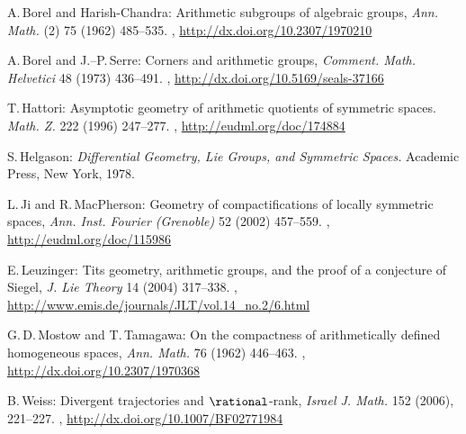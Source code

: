 \begin{references}{9}

 A.\,Borel and Harish-Chandra:
 Arithmetic subgroups of algebraic groups,
 \emph{Ann. Math.} (2) 75 (1962) 485--535.
 ,
 \maynewline
 \url{http://dx.doi.org/10.2307/1970210}

 A.\,Borel and J.--P.\,Serre:
 Corners and arithmetic groups,
 \emph{Comment. Math. Helvetici} 48 (1973) 436--491.
,
\maynewline
\url{http://dx.doi.org/10.5169/seals-37166}

 T.\,Hattori:
 Asymptotic geometry of arithmetic quotients of symmetric spaces.
 \emph{Math. Z.} 222 (1996) 247--277. 
 ,
 \maynewline 
 \url{http://eudml.org/doc/174884}

 S.\,Helgason:
 \emph{Differential Geometry, Lie Groups, and Symmetric Spaces.}
 Academic Press, New York, 1978.

L.\,Ji and R.\,MacPherson:
Geometry of compactifications of locally symmetric spaces,
\emph{Ann. Inst. Fourier (Grenoble)} 52 (2002) 457--559. 
, 
\url{http://eudml.org/doc/115986}

E.\,Leuzinger:
Tits geometry, arithmetic groups, and the proof of a conjecture of Siegel,
\emph{J. Lie Theory} 14 (2004) 317--338.
,
\url{http://www.emis.de/journals/JLT/vol.14_no.2/6.html}

 G.\,D.\,Mostow and T.\,Tamagawa:
 On the compactness of arithmetically defined homogeneous
spaces,
 \emph{Ann. Math.} 76 (1962) 446--463.
 ,
 \maynewline
 \url{http://dx.doi.org/10.2307/1970368}


B.\,Weiss:
Divergent trajectories and $\rational$-rank,
\emph{Israel J. Math.} 152 (2006), 221--227.
,
\maynewline
\url{http://dx.doi.org/10.1007/BF02771984}

 \end{references}
